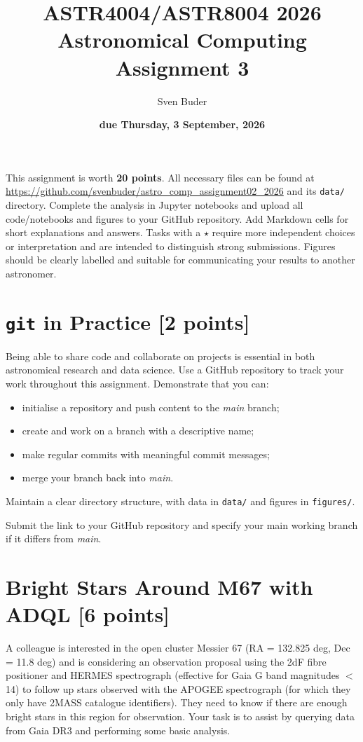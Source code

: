 \documentclass[a4paper,12pt]{article}
\title{\vspace{-1cm}\Huge{ASTR4004/ASTR8004 2026\\Astronomical Computing Assignment 3}}
\author{Sven Buder}
\date{\textbf{due Thursday, 3 September, 2026}}
\begin{document}
\maketitle

This assignment is worth \textbf{20 points}. All necessary files can be found at \url{https://github.com/svenbuder/astro_comp_assignment02_2026} and its \texttt{data/} directory.
Complete the analysis in Jupyter notebooks and upload all code/notebooks and figures to your GitHub repository. Add Markdown cells for short explanations and answers.
Tasks with a $\star$ require more independent choices or interpretation and are intended to distinguish strong submissions.
Figures should be clearly labelled and suitable for communicating your results to another astronomer.

\section{\texttt{git} in Practice \hfill [2 points]}

Being able to share code and collaborate on projects is essential in both astronomical research and data science. Use a GitHub repository to track your work throughout this assignment.
Demonstrate that you can:

\begin{itemize}
    \item initialise a repository and push content to the \textit{main} branch;
    \item create and work on a branch with a descriptive name;
    \item make regular commits with meaningful commit messages;
    \item merge your branch back into \textit{main}.
\end{itemize}

Maintain a clear directory structure, with data in \texttt{data/} and figures in \texttt{figures/}.

Submit the link to your GitHub repository and specify your main working branch if it differs from \textit{main}.

\section{Bright Stars Around M67 with ADQL \hfill [6 points]}

A colleague is interested in the open cluster Messier 67 (RA = 132.825 deg, Dec = 11.8 deg) and is considering an observation proposal using the 2dF fibre positioner and HERMES spectrograph (effective for Gaia G band magnitudes $<$ 14) to follow up stars observed with the APOGEE spectrograph (for which they only have 2MASS catalogue identifiers). They need to know if there are enough bright stars in this region for observation. Your task is to assist by querying data from Gaia DR3 and performing some basic analysis.
\end{document}
